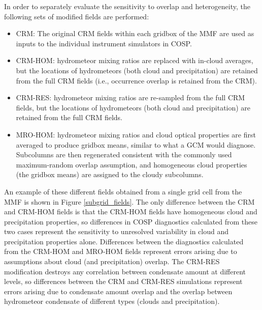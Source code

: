 \documentclass[letter]{article}
\begin{document}
In order to separately evaluate the sensitivity to overlap and heterogeneity, the following sets of modified fields are performed:
\begin{itemize}
    \item CRM: The original CRM fields within each gridbox of the MMF are used as inputs to the individual instrument simulators in COSP.
    \item CRM-HOM: hydrometeor mixing ratios are replaced with in-cloud averages, but the locations of hydrometeors (both cloud and precipitation) are retained from the full CRM fields (i.e., occurrence overlap is retained from the CRM).
    \item CRM-RES: hydrometeor mixing ratios are re-sampled from the full CRM fields, but the locations of hydrometeors (both cloud and precipitation) are retained from the full CRM fields.
    \item MRO-HOM: hydrometeor mixing ratios and cloud optical properties are first averaged to produce gridbox means, similar to what a GCM would diagnose. Subcolumns are then regenerated consistent with the commonly used maximum-random overlap assumption, and homogeneous cloud properties (the gridbox means) are assigned to the cloudy subcolumns.
\end{itemize}
An example of these different fields obtained from a single grid cell from the MMF is shown in Figure \ref{subgrid_fields}. The only difference between the CRM and CRM-HOM fields is that the CRM-HOM fields have homogeneous cloud and precipitation properties, so differences in COSP diagnostics calculated from these two cases represent the sensitivity to unresolved variability in cloud and precipitation properties alone. Differences between the diagnostics calculated from the CRM-HOM and MRO-HOM fields represent errors arising due to assumptions about cloud (and precipitation) overlap. The CRM-RES modification destroys any correlation between condensate amount at different levels, so differences between the CRM and CRM-RES simulations represent errors arising due to condensate amount overlap and the overlap between hydrometeor condensate of different types (clouds and precipitation).
\end{document}

